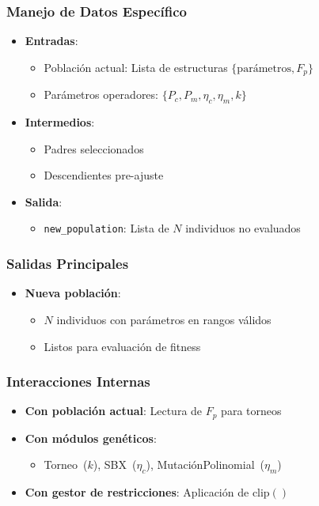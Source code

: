 \subsubsection{Manejo de Datos Específico}
\begin{itemize}
    \item \textbf{Entradas}:
    \begin{itemize}
        \item Población actual: Lista de estructuras $\{\text{parámetros}, F_p\}$
        \item Parámetros operadores: $\{P_c, P_m, \eta_c, \eta_m, k\}$
    \end{itemize}

    \item \textbf{Intermedios}:
    \begin{itemize}
        \item Padres seleccionados
        \item Descendientes pre-ajuste
    \end{itemize}

    \item \textbf{Salida}:
    \begin{itemize}
        \item \texttt{new\_population}: Lista de $N$ individuos no evaluados
    \end{itemize}
\end{itemize}

\subsubsection{Salidas Principales}
\begin{itemize}
    \item \textbf{Nueva población}:
    \begin{itemize}
        \item $N$ individuos con parámetros en rangos válidos
        \item Listos para evaluación de fitness
    \end{itemize}
\end{itemize}

\subsubsection{Interacciones Internas}
\begin{itemize}
    \item \textbf{Con población actual}: Lectura de $F_p$ para torneos
    \item \textbf{Con módulos genéticos}:
    \begin{itemize}
        \item Torneo~($k$), SBX~($\eta_c$), MutaciónPolinomial~($\eta_m$)
    \end{itemize}
    \item \textbf{Con gestor de restricciones}: Aplicación de $\text{clip}()$
\end{itemize}
\newpage
